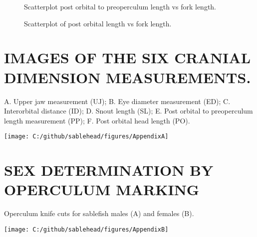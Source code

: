 \documentclass[12pt]{article}\usepackage[]{graphicx}\usepackage[]{color}
\begin{document}
\begin{figure}[htb]

{\centering {} 

}

\caption{Scatterplot post orbital to preoperculum length vs fork length.}\label{fig:figure6}
\end{figure}

\begin{figure}[htb]

{\centering {} 

}

\caption{Scatterplot of post orbital length vs fork length.}\label{fig:figure7}
\end{figure}
\clearpage

\begin{appendices}

\clearpage

\section{IMAGES OF THE SIX CRANIAL DIMENSION MEASUREMENTS.}
\label{app:first-appendix}

A. Upper jaw measurement (UJ); B. Eye diameter measurement (ED); C. Interorbital distance (ID); D. Snout length (SL); E. Post orbital to preoperculum length measurement (PP); F. Post orbital head length (PO).
\begin{center}\texttt{[image: C:/github/sablehead/figures/AppendixA]} \end{center}

\clearpage

\section{SEX DETERMINATION BY OPERCULUM MARKING}
\label{app:second-appendix}

Operculum knife cuts for sablefish males (A) and females (B).
\begin{center}\texttt{[image: C:/github/sablehead/figures/AppendixB]} \end{center}
\clearpage

\end{appendices}
\end{document}
